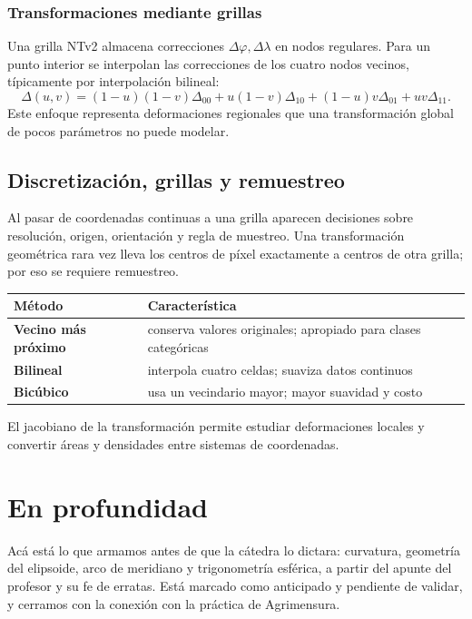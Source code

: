 \subsubsection{Transformaciones mediante grillas}

Una grilla NTv2 almacena correcciones \(\Delta\varphi,\Delta\lambda\) en nodos regulares. Para
un punto interior se interpolan las correcciones de los cuatro nodos vecinos, típicamente por
interpolación bilineal:
\[
\Delta(u,v)=
(1-u)(1-v)\Delta_{00}
+u(1-v)\Delta_{10}
+(1-u)v\Delta_{01}
+uv\Delta_{11}.
\]
Este enfoque representa deformaciones regionales que una transformación global de pocos
parámetros no puede modelar.

\subsection{Discretización, grillas y remuestreo}

Al pasar de coordenadas continuas a una grilla aparecen decisiones sobre resolución,
origen, orientación y regla de muestreo. Una transformación geométrica rara vez lleva los
centros de píxel exactamente a centros de otra grilla; por eso se requiere remuestreo.

\begin{center}
\begin{tabularx}{.9\textwidth}{>{\bfseries}l X}
\toprule
Método & Característica\\
\midrule
Vecino más próximo & conserva valores originales; apropiado para clases categóricas\\
Bilineal & interpola cuatro celdas; suaviza datos continuos\\
Bicúbico & usa un vecindario mayor; mayor suavidad y costo\\
\bottomrule
\end{tabularx}
\end{center}

El jacobiano de la transformación permite estudiar deformaciones locales y convertir áreas
y densidades entre sistemas de coordenadas.

\section{En profundidad}

Acá está lo que armamos antes de que la cátedra lo dictara: curvatura, geometría del elipsoide, arco de meridiano y trigonometría esférica, a partir del apunte del profesor y su fe de erratas. Está marcado como anticipado y pendiente de validar, y cerramos con la conexión con la práctica de Agrimensura.

